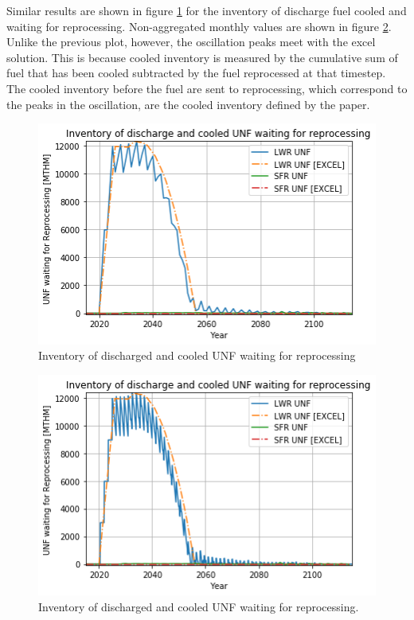 Similar results are shown in figure \ref{fig:waiting} for the inventory of discharge fuel cooled and waiting
for reprocessing. Non-aggregated monthly values are shown in figure \ref{fig:waiting_monthly}.
Unlike the previous plot, however, the oscillation peaks meet with the excel
solution.  This is because cooled inventory is measured by the cumulative sum
of fuel that has been cooled subtracted by the fuel reprocessed at that timestep.
The cooled inventory before the fuel are sent to reprocessing, which correspond
to the peaks in the oscillation, are the cooled inventory defined by the paper.

\begin{figure}[htbp!]
    \begin{center}
        \includegraphics[scale=0.6]{./images/results_18/waiting.png}
    \end{center}
        \caption{Inventory of discharged and cooled \gls{UNF} waiting for reprocessing}
    \label{fig:waiting}
\end{figure}

\begin{figure}[htbp!]
    \begin{center}
        \includegraphics[scale=0.6]{./images/results_18/waiting_monthly.png}
    \end{center}
        \caption{Inventory of discharged and cooled \gls{UNF} waiting for reprocessing.}
    \label{fig:waiting_monthly}
\end{figure}


